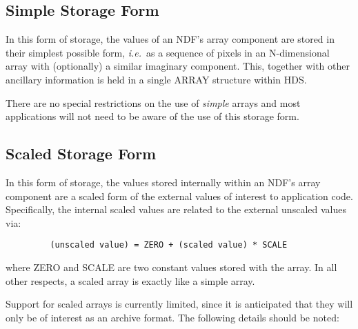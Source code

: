 \documentclass[twoside,11pt]{article}
\newcommand{\xref}[3]{#1}
\newcommand{\xlabel}[1]{}
\newcommand{\st}[1]{{\em{#1}}}
\begin{document}
\subsection{\xlabel{simple_storage_form}\label{ss:simpleform}Simple Storage Form}

In this form of storage, the values of an NDF's array component 
are stored in their simplest possible form, \st{i.e.}\ as a sequence of
pixels in an N-dimensional array with (optionally) a similar imaginary
component. 
This, together with other ancillary information is held in a single
\xref{ARRAY}{sun11}{} structure within \xref{HDS}{sun92}{}.

There are no special restrictions on the use of \st{simple\/} arrays and most
applications will not need to be aware of the use of this storage form. 

\subsection{\xlabel{scaled_storage_form}\label{ss:scaledform}Scaled Storage Form}

In this form of storage, the values stored internally within an NDF's array 
component are a scaled form of the external values of interest to
application code. Specifically, the internal scaled values are related to
the external unscaled values via:

\begin{verbatim}
         (unscaled value) = ZERO + (scaled value) * SCALE
\end{verbatim}

where ZERO and SCALE are two constant values stored with the array. In
all other respects, a scaled array is exactly like a simple array.

Support for scaled arrays is currently limited, since it is anticipated
that they will only be of interest as an archive format. The following
details should be noted:
\end{document}
